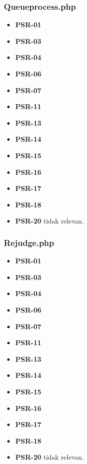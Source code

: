 \subsubsection{Queueprocess.php}
\begin{itemize}
	\item \textbf{PSR-01} 
	\item \textbf{PSR-03}
	\item \textbf{PSR-04}
	\item \textbf{PSR-06}
	\item \textbf{PSR-07}
	\item \textbf{PSR-11}
	\item \textbf{PSR-13}
	\item \textbf{PSR-14}
	\item \textbf{PSR-15}
	\item \textbf{PSR-16}
	\item \textbf{PSR-17} 
	\item \textbf{PSR-18} 
	\item \textbf{PSR-20} tidak relevan.
\end{itemize}

\subsubsection{Rejudge.php}
\begin{itemize}
	\item \textbf{PSR-01} 
	\item \textbf{PSR-03}
	\item \textbf{PSR-04}
	\item \textbf{PSR-06}
	\item \textbf{PSR-07}
	\item \textbf{PSR-11}
	\item \textbf{PSR-13}
	\item \textbf{PSR-14}
	\item \textbf{PSR-15}
	\item \textbf{PSR-16}
	\item \textbf{PSR-17} 
	\item \textbf{PSR-18} 
	\item \textbf{PSR-20} tidak relevan.
\end{itemize}

